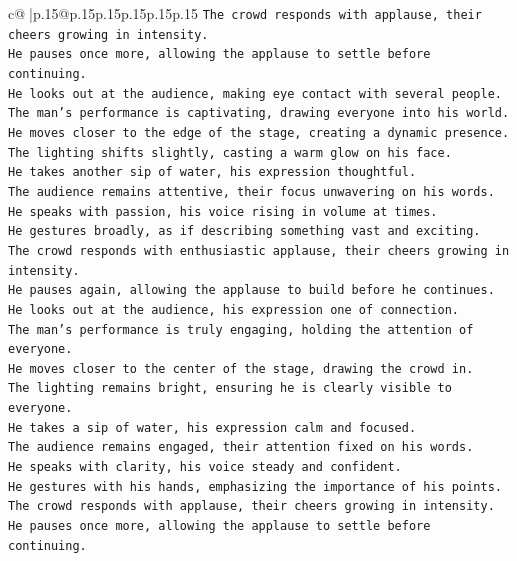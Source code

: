 \documentclass{article}
\begin{document}
{\begin{supertabular}{c@{$\;$}|p{.15\linewidth}@{}p{.15\linewidth}p{.15\linewidth}p{.15\linewidth}p{.15\linewidth}p{.15\linewidth}}
{{{\texttt{The crowd responds with applause, their cheers growing in intensity.  } \\
\texttt{He pauses once more, allowing the applause to settle before continuing.  } \\
\texttt{He looks out at the audience, making eye contact with several people.  } \\
\texttt{The man's performance is captivating, drawing everyone into his world.  } \\
\texttt{He moves closer to the edge of the stage, creating a dynamic presence.  } \\
\texttt{The lighting shifts slightly, casting a warm glow on his face.  } \\
\texttt{He takes another sip of water, his expression thoughtful.  } \\
\texttt{The audience remains attentive, their focus unwavering on his words.  } \\
\texttt{He speaks with passion, his voice rising in volume at times.  } \\
\texttt{He gestures broadly, as if describing something vast and exciting.  } \\
\texttt{The crowd responds with enthusiastic applause, their cheers growing in intensity.  } \\
\texttt{He pauses again, allowing the applause to build before he continues.  } \\
\texttt{He looks out at the audience, his expression one of connection.  } \\
\texttt{The man's performance is truly engaging, holding the attention of everyone.  } \\
\texttt{He moves closer to the center of the stage, drawing the crowd in.  } \\
\texttt{The lighting remains bright, ensuring he is clearly visible to everyone.  } \\
\texttt{He takes a sip of water, his expression calm and focused.  } \\
\texttt{The audience remains engaged, their attention fixed on his words.  } \\
\texttt{He speaks with clarity, his voice steady and confident.  } \\
\texttt{He gestures with his hands, emphasizing the importance of his points.  } \\
\texttt{The crowd responds with applause, their cheers growing in intensity.  } \\
\texttt{He pauses once more, allowing the applause to settle before continuing.  } \\
}}}
\end{supertabular}}
\end{document}
